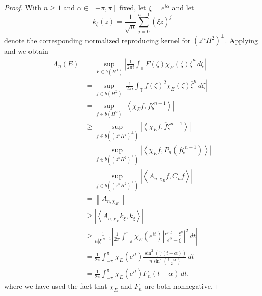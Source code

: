 \documentclass[11pt,reqno]{amsart}
\numberwithin{equation}{section}
\theoremstyle{plain}
\theoremstyle{definition}
\begin{document}
	\begin{proof}
		With $n \geq 1$ and $\alpha \in [-\pi, \pi]$ fixed, let $\xi = e^{i \alpha}$ and let 
		\begin{equation*}
			k_{\xi}(z) = \frac{1}{\sqrt{n}} \sum_{j = 0}^{n - 1} (\overline{\xi} z)^{j}
		\end{equation*}
		denote the corresponding normalized reproducing kernel for $(z^n H^2)^{\perp}$.
		Applying \cite[Thm.~3.1]{CFT} and \cite[Thm.~1]{NLEPHS} we obtain
		\begin{align}
		\Lambda_n(E)
			&=  \sup_{F \in b(H^1)} \left| \frac{1}{2\pi i } \int_{\mathbb{T}} F(\zeta)\chi_E(\zeta) \overline{\zeta}^{n}\,d\zeta \right| \nonumber \\
			&= \sup_{f \in b(H^2)} \left| \frac{1}{2\pi i } \int_{\mathbb{T}}  f(\zeta)^2 \chi_E(\zeta) \overline{\zeta}^{n}\,d\zeta \right| \nonumber \\
			&= \sup_{f \in b(H^2)} | {\left< { \chi_E  f, \overline{f} \zeta^{n-1}} \right>} | \nonumber \\
			&\geq \sup_{f \in b((z^n H^2)^{\perp})} | {\left< { \chi_E  f, \overline{f} \zeta^{n-1}} \right>} | \nonumber \\
			&= \sup_{f \in b((z^n H^2)^{\perp})} | {\left< { \chi_E  f, P_{n}(\overline{f} \zeta^{n-1})} \right>} | \nonumber \\
			&= \sup_{f \in b((z^n H^2)^{\perp})} | {\left< { A_{n, \chi_E} f, C_n f} \right>} | \nonumber \\
			&= {\left\| {A_{n, \chi_E}} \right\|} \nonumber \\
			&\geq  | {\left< {A_{n, \chi_E} k_{\xi}, k_{\xi}} \right>} |\nonumber \\
			&\geq \frac{1}{n| \xi |^{n-1}} \left| \frac{1}{2\pi} \int_{-\pi}^{\pi} \chi_E(e^{it})
				\left| \frac{ e^{int} - \xi^n }{ e^{it} - \xi} \right|^2\,dt\right| \nonumber \\
			&= \frac{1}{2 \pi} \int_{-\pi}^{\pi} \chi_E(e^{it})
				\frac{ \sin^2 \left( \frac{n}{2}(t - \alpha) \right) }{n \sin^2 \left(\frac{t-\alpha}{2}\right)}\,dt \nonumber \\
			&= \frac{1}{2\pi}\int_{-\pi}^{\pi} \chi_E(e^{it}) F_n(t-\alpha)\,dt, \label{eq-LLFSB}
		\end{align}
		where we have used the fact that $\chi_E$ and $F_n$ are both nonnegative.
	\end{proof}

	
	
	
	
	
	
\end{document}

